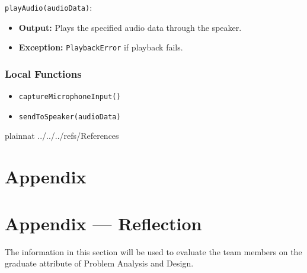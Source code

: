 \documentclass[12pt, titlepage]{article}
\begin{document}
\noindent \texttt{playAudio(audioData)}:
\begin{itemize}  
    \item \textbf{Output:} Plays the specified audio data through the speaker.  
    \item \textbf{Exception:} \texttt{PlaybackError} if playback fails.  
\end{itemize}  

\subsubsection{Local Functions}  
\begin{itemize}  
    \item \texttt{captureMicrophoneInput()}  
    \item \texttt{sendToSpeaker(audioData)}  
\end{itemize}  


\newpage

 {plainnat}
 {../../../refs/References}

\newpage

\section{Appendix} \label{Appendix}


\newpage{}

\section*{Appendix --- Reflection}

The information in this section will be used to evaluate the team members on the
graduate attribute of Problem Analysis and Design.


\end{document}
